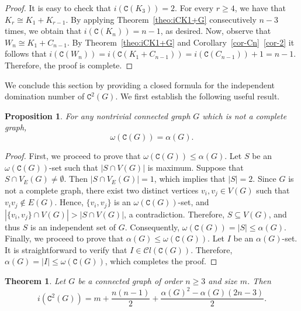 \documentclass[12pt]{article}
\newtheorem{theorem}[remark]{Theorem}
\newtheorem{proposition}[remark]{Proposition}
\begin{document}
\begin{proof}
It is easy to check that $i(\mathtt{C}(K_3))=2$. For every $r\geq 4$, we have that  $K_r\cong K_1+K_{r-1}$. By applying Theorem~\ref{theo:iCK1+G} consecutively $n-3$ times, we obtain that  $i(\mathtt{C}(K_n))= n-1$, as desired. Now, observe that $W_n\cong K_1+C_{n-1}$. By Theorem~\ref{theo:iCK1+G} and Corollary~\ref{cor-Cn}~\ref{cor-2} it follows that $i(\mathtt{C}(W_n))=i(\mathtt{C}(K_1+C_{n-1}))=i(\mathtt{C}(C_{n-1}))+1 =n-1.$ Therefore, the proof is complete.
\end{proof}

\noindent
We conclude this section by providing a closed formula for the independent domination number of $\mathtt{C}^2(G)$. We first establish the following useful result.

\begin{proposition}\label{prop-clique}
For any nontrivial connected graph $G$ which is not a complete graph,
$$\omega(\mathtt{C}(G)) = \alpha(G).$$
\end{proposition}

\begin{proof}
First, we proceed to prove that $\omega(\mathtt{C}(G)) \leq \alpha(G)$. Let $S$ be an $\omega(\mathtt{C}(G))$-set such that $|S \cap V(G)|$ is maximum. Suppose that $S \cap V_E(G) \neq \emptyset$. Then $|S \cap V_E(G)|=1$, which implies that $|S| = 2$. Since $G$ is not a complete graph, there exist two distinct vertices $v_i,v_j \in V(G)$ such that $v_iv_j \notin E(G)$. Hence, $\{v_i,v_j\}$ is an $\omega(\mathtt{C}(G))$-set, and $|\{v_i,v_j\}\cap V(G)| > |S\cap V(G)|$, a contradiction. Therefore, $S \subseteq V(G)$, and thus $S$ is an independent set of $G$. Consequently, $\omega(\mathtt{C}(G)) = |S| \leq \alpha(G)$. Finally, we proceed to prove that $\alpha(G) \leq \omega(\mathtt{C}(G))$. Let $I$ be an $\alpha(G)$-set. It is straightforward to verify that $I \in \mathcal{C}l(\mathtt{C}(G))$. Therefore, $\alpha(G) = |I| \leq \omega(\mathtt{C}(G))$, which completes the proof.
\end{proof}


\begin{theorem}
Let $G$ be a connected graph of order $n\geq 3$ and size $m$. Then
$$i (\mathtt{C}^{2}(G)) = m + \frac{n(n-1)}{2} + \frac{\alpha(G)^{2} - \alpha(G) (2n-3)}{2}.$$
\end{theorem}
\end{document}
